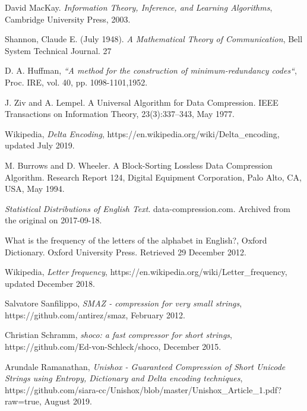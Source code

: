 \documentclass[]{article}
\begin{document}
\begin{thebibliography}{1}

	 David MacKay. {\em Information Theory, Inference, and Learning Algorithms}, Cambridge University Press, 2003.

	 Shannon, Claude E. (July 1948). {\em A Mathematical Theory of Communication}, Bell System Technical Journal. 27
 
	 D. A. Huffman, {\em“A method for the construction of minimum-redundancy codes“}, Proc. IRE, vol. 40, pp. 1098-1101,1952.
 
 	 J. Ziv and A. Lempel. A Universal Algorithm for Data Compression. IEEE Transactions on Information Theory, 23(3):337–343, May 1977.
 
  	 Wikipedia, {\em Delta Encoding}, https://en.wikipedia.org/wiki/Delta\_encoding, updated July 2019.
 
	 M. Burrows and D. Wheeler. A Block-Sorting Lossless Data Compression Algorithm. Research Report 124, Digital Equipment Corporation, Palo Alto, CA, USA, May 1994.

	 {\em Statistical Distributions of English Text}. data-compression.com. Archived from the original on 2017-09-18.

 	 What is the frequency of the letters of the alphabet in English?, Oxford Dictionary. Oxford University Press. Retrieved 29 December 2012.

	 Wikipedia, {\em Letter frequency}, https://en.wikipedia.org/wiki/Letter\_frequency, updated December 2018.

 	 Salvatore Sanfilippo, {\em SMAZ - compression for very small strings}, https://github.com/antirez/smaz, February 2012.

 	 Christian Schramm, {\em shoco: a fast compressor for short strings}, https://github.com/Ed-von-Schleck/shoco, December 2015.

	 Arundale Ramanathan, {\em Unishox - Guaranteed Compression of Short Unicode Strings using Entropy, Dictionary and Delta encoding techniques}, https://github.com/siara-cc/Unishox/blob/master/Unishox\_Article\_1.pdf?raw=true, August 2019.

\end{thebibliography}
\end{document}
